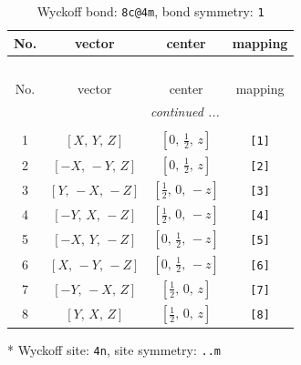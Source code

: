 \documentclass[fleqn,8pt]{jsarticle}
\begin{document}
\renewcommand{\arraystretch}{1.2}
\begin{longtable}{cccc}
\caption{Wyckoff bond: {\tt 8c@4m}, bond symmetry: {\tt 1}}
 \\
 \hline \hline
No. & vector & center & mapping \\ \hline \endfirsthead

\multicolumn{3}{l}{\tablename\ \thetable{}} \\
 \hline \hline
No. & vector & center & mapping \\ \hline \endhead

 \hline \hline
\multicolumn{3}{r}{\footnotesize\it continued ...} \\ \endfoot

 \hline \hline
\multicolumn{3}{r}{} \\ \endlastfoot

1 & $\left[ X,\, Y,\, Z \right]$ & $\left[ 0,\, \frac{1}{2},\, z \right]$ & {\tt [1]} \\ \hline
2 & $\left[ - X,\, - Y,\, Z \right]$ & $\left[ 0,\, \frac{1}{2},\, z \right]$ & {\tt [2]} \\ \hline
3 & $\left[ Y,\, - X,\, - Z \right]$ & $\left[ \frac{1}{2},\, 0,\, - z \right]$ & {\tt [3]} \\ \hline
4 & $\left[ - Y,\, X,\, - Z \right]$ & $\left[ \frac{1}{2},\, 0,\, - z \right]$ & {\tt [4]} \\ \hline
5 & $\left[ - X,\, Y,\, - Z \right]$ & $\left[ 0,\, \frac{1}{2},\, - z \right]$ & {\tt [5]} \\ \hline
6 & $\left[ X,\, - Y,\, - Z \right]$ & $\left[ 0,\, \frac{1}{2},\, - z \right]$ & {\tt [6]} \\ \hline
7 & $\left[ - Y,\, - X,\, Z \right]$ & $\left[ \frac{1}{2},\, 0,\, z \right]$ & {\tt [7]} \\ \hline
8 & $\left[ Y,\, X,\, Z \right]$ & $\left[ \frac{1}{2},\, 0,\, z \right]$ & {\tt [8]} \\
\end{longtable}
* Wyckoff site: {\tt 4n}, site symmetry: {\tt ..m}
\renewcommand{\arraystretch}{1.2}
\end{document}
